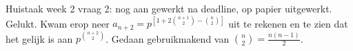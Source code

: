 \documentclass[hidequestions]{homework}
\begin{document}



Huistaak week 2 vraag 2: nog aan gewerkt na deadline, op papier uitgewerkt. 
Gelukt. 
Kwam erop neer $a_{n+2}=p^{[1+2\binom{n+1}{2}-\binom{n}{2}]}$ uit te rekenen en te zien dat het gelijk is aan $p^{\binom{n+2}{2}}$. Gedaan gebruikmakend van $\binom{n}{2} = \frac{n(n-1)}{2}$. 
\end{document}
